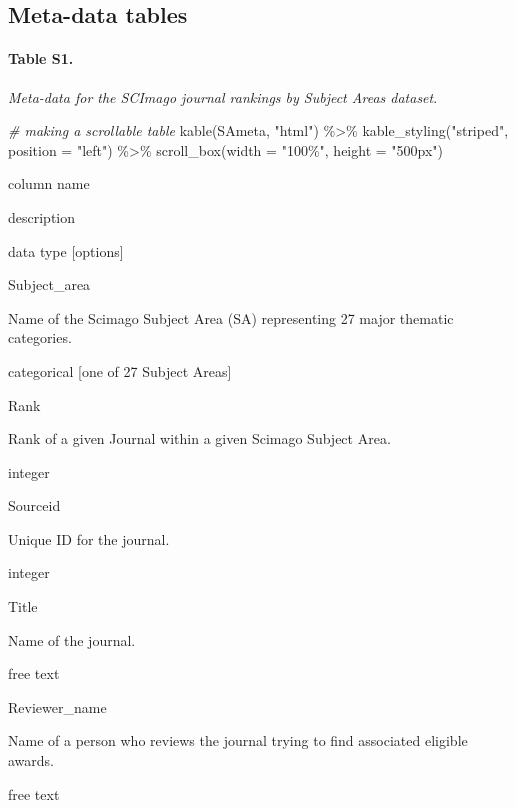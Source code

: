 \documentclass[
]{article}
\newenvironment{Shaded}{\begin{snugshade}}{\end{snugshade}}
\newcommand{\AttributeTok}[1]{\textcolor[rgb]{0.77,0.63,0.00}{#1}}
\newcommand{\CommentTok}[1]{\textcolor[rgb]{0.56,0.35,0.01}{\textit{#1}}}
\newcommand{\FunctionTok}[1]{\textcolor[rgb]{0.00,0.00,0.00}{#1}}
\newcommand{\NormalTok}[1]{#1}
\newcommand{\SpecialCharTok}[1]{\textcolor[rgb]{0.00,0.00,0.00}{#1}}
\newcommand{\StringTok}[1]{\textcolor[rgb]{0.31,0.60,0.02}{#1}}
\begin{document}
\hypertarget{meta-data-tables}{%
\subsection{Meta-data tables}\label{meta-data-tables}}

\hypertarget{table-s1.}{%
\paragraph{Table S1.}\label{table-s1.}}

\emph{Meta-data for the SCImago journal rankings by Subject Areas
dataset}.

\begin{Shaded}
\begin{Highlighting}[]
\CommentTok{\# making a scrollable table}
\FunctionTok{kable}\NormalTok{(SAmeta, }\StringTok{"html"}\NormalTok{) }\SpecialCharTok{\%\textgreater{}\%}
  \FunctionTok{kable\_styling}\NormalTok{(}\StringTok{"striped"}\NormalTok{, }\AttributeTok{position =} \StringTok{"left"}\NormalTok{) }\SpecialCharTok{\%\textgreater{}\%}
  \FunctionTok{scroll\_box}\NormalTok{(}\AttributeTok{width =} \StringTok{"100\%"}\NormalTok{, }\AttributeTok{height =} \StringTok{"500px"}\NormalTok{)}
\end{Highlighting}
\end{Shaded}

column name

description

data type {[}options{]}

Subject\_area

Name of the Scimago Subject Area (SA) representing 27 major thematic
categories.

categorical {[}one of 27 Subject Areas{]}

Rank

Rank of a given Journal within a given Scimago Subject Area.

integer

Sourceid

Unique ID for the journal.

integer

Title

Name of the journal.

free text

Reviewer\_name

Name of a person who reviews the journal trying to find associated
eligible awards.

free text
\end{document}

